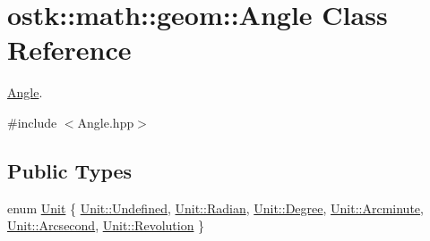 \hypertarget{classostk_1_1math_1_1geom_1_1_angle}{}\section{ostk\+:\+:math\+:\+:geom\+:\+:Angle Class Reference}
\label{classostk_1_1math_1_1geom_1_1_angle}


\hyperlink{classostk_1_1math_1_1geom_1_1_angle}{Angle}.  




{\ttfamily \#include $<$Angle.\+hpp$>$}

\subsection*{Public Types}
\begin{DoxyCompactItemize}
\item 
enum \hyperlink{classostk_1_1math_1_1geom_1_1_angle_abb73526d3f7f94a3b33e8358e1b18027}{Unit} \{ \newline
\hyperlink{classostk_1_1math_1_1geom_1_1_angle_abb73526d3f7f94a3b33e8358e1b18027aec0fc0100c4fc1ce4eea230c3dc10360}{Unit\+::\+Undefined}, 
\hyperlink{classostk_1_1math_1_1geom_1_1_angle_abb73526d3f7f94a3b33e8358e1b18027a50c62e3ca8d8ec8732a7f968a3bf2c7c}{Unit\+::\+Radian}, 
\hyperlink{classostk_1_1math_1_1geom_1_1_angle_abb73526d3f7f94a3b33e8358e1b18027a6669c4dc00cb161446821b3529ca07d8}{Unit\+::\+Degree}, 
\hyperlink{classostk_1_1math_1_1geom_1_1_angle_abb73526d3f7f94a3b33e8358e1b18027a6d59f6ca1b5de72cbdc10a6792bcf090}{Unit\+::\+Arcminute}, 
\newline
\hyperlink{classostk_1_1math_1_1geom_1_1_angle_abb73526d3f7f94a3b33e8358e1b18027a7839ceecae19481f2e21e0ce3e11d3aa}{Unit\+::\+Arcsecond}, 
\hyperlink{classostk_1_1math_1_1geom_1_1_angle_abb73526d3f7f94a3b33e8358e1b18027aad09b2d48b2811c68e5a2bf421f7f2f2}{Unit\+::\+Revolution}
 \}
\end{DoxyCompactItemize}
